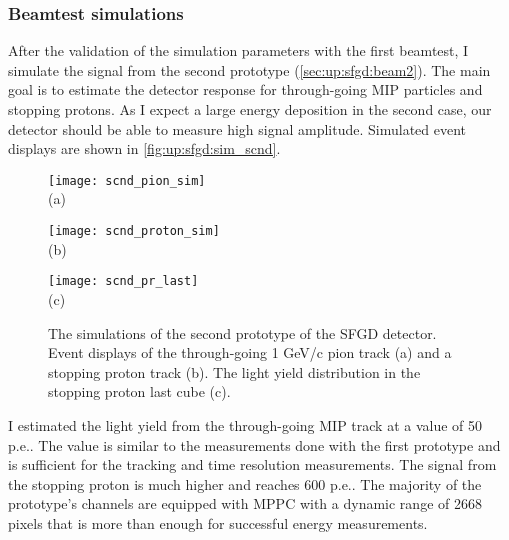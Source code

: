 \documentclass[main.tex]{subfiles}
\begin{document}
\subsubsection{Beamtest simulations}
After the validation of the simulation parameters with the first beamtest, I simulate the signal from the second prototype (\autoref{sec:up:sfgd:beam2}). The main goal is to estimate the detector response for through-going MIP particles and stopping protons. As I expect a large energy deposition in the second case, our detector should be able to measure high signal amplitude. Simulated event displays are shown in \autoref{fig:up:sfgd:sim_scnd}.

\begin{figure}[!ht]
	\centering
	\begin{minipage}{0.33\linewidth}
		\centering
		\texttt{[image: scnd\_pion\_sim]} \\ (a)
	\end{minipage}
	\begin{minipage}{0.33\linewidth}
		\centering
		\texttt{[image: scnd\_proton\_sim]} \\ (b)
	\end{minipage}
	\begin{minipage}{0.33\linewidth}
		\centering
		\texttt{[image: scnd\_pr\_last]} \\ (c)
	\end{minipage}
	\caption{The simulations of the second prototype of the SFGD detector. Event displays of the through-going 1 GeV/c pion track (a) and a stopping proton track (b). The light yield distribution in the stopping proton last cube (c).}
	\label{fig:up:sfgd:sim_scnd}
\end{figure}

I estimated the light yield from the through-going MIP track at a value of 50 p.e.. The value is similar to the measurements done with the first prototype and is sufficient for the tracking and time resolution measurements. The signal from the stopping proton is much higher and reaches 600 p.e.. The majority of the prototype's channels are equipped with MPPC with a dynamic range of 2668 pixels that is more than enough for successful energy measurements.
\end{document}

